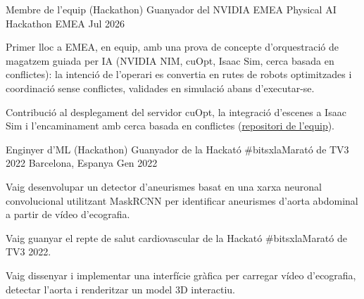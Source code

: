 \begin{cventries}

\cventry
{Membre de l'equip (Hackathon)}
{Guanyador del NVIDIA EMEA Physical AI Hackathon}
{EMEA}
{Jul 2026}
{
\begin{cvitems}
\item{Primer lloc a EMEA, en equip, amb una prova de concepte d'orquestració de magatzem guiada per IA (NVIDIA NIM, cuOpt, Isaac Sim, cerca basada en conflictes): la intenció de l'operari es convertia en rutes de robots optimitzades i coordinació sense conflictes, validades en simulació abans d'executar-se.}
\item{Contribució al desplegament del servidor cuOpt, la integració d'escenes a Isaac Sim i l'encaminament amb cerca basada en conflictes (\href{https://github.com/Wess2s/team_D_pai}{repositori de l'equip}).}
\end{cvitems}
}

\vspace{3mm}
\cventry
{Enginyer d'ML (Hackathon)}
{Guanyador de la Hackató \#bitsxlaMarató de TV3 2022}
{Barcelona, Espanya}
{Gen 2022}
{
\begin{cvitems}
\item{Vaig desenvolupar un detector d'aneurismes basat en una xarxa neuronal convolucional utilitzant MaskRCNN per identificar aneurismes d'aorta abdominal a partir de vídeo d'ecografia.}
\item{Vaig guanyar el repte de salut cardiovascular de la Hackató \#bitsxlaMarató de TV3 2022.}
\item{Vaig dissenyar i implementar una interfície gràfica per carregar vídeo d'ecografia, detectar l'aorta i renderitzar un model 3D interactiu.}
\end{cvitems}
}

\end{cventries}
